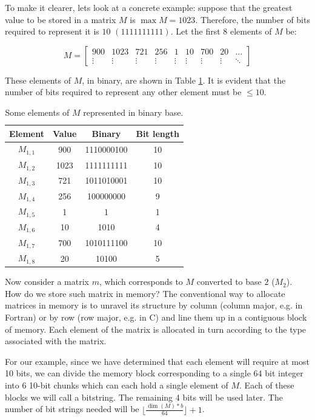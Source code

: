 \documentclass[10pt]{article}
\begin{document}
To make it clearer, lets look at a concrete example: suppose that the greatest value to be stored in a matrix $M$ is $\max M=1023$. Therefore, the number of bits required to represent it is $10$ $(1111111111)$. Let the first 8 elements of $M$ be:

\begin{equation} \label{eq:08}
  M = \begin{bmatrix}
  900 & 1023 & 721 & 256 & 1 & 10 & 700 & 20 & \hdots\\ 
  \vdots & \vdots & \vdots & \vdots & \vdots & \vdots & \vdots & \vdots & \ddots 
  \end{bmatrix}
\end{equation}

These elements of $M$, in binary, are shown in Table \ref{tab:01}. It is evident that the number of bits required to represent any other element must be $\leq 10$.

\begin{table}[h]
 \centering
 \caption{Some elements of $M$ represented in binary base.}
 \begin{tabular}{cccc} 
  \hline 
  Element & Value  & Binary & Bit length\\
  \hline
  $M_{1,1}$ & 900  & 1110000100 & 10\\
  $M_{1,2}$ & 1023 & 1111111111 & 10\\
  $M_{1,3}$ & 721  & 1011010001 & 10\\
  $M_{1,4}$ & 256  & 100000000  & 9\\
  $M_{1,5}$ & 1    & 1          & 1\\
  $M_{1,6}$ & 10   & 1010       & 4\\
  $M_{1,7}$ & 700  & 1010111100 & 10\\
  $M_{1,8}$ & 20   & 10100      & 5\\
  \hline
 \end{tabular}
 \label{tab:01}
\end{table}

Now consider a matrix $m$, which corresponds to $M$ converted to base $2$ ($M_2$). How do we store such matrix in memory? The conventional way to allocate matrices in memory is to unravel its structure by column (column major, e.g. in Fortran) or by row (row major, e.g. in C) and line them up in a contiguous block of memory. Each element of the matrix is allocated in turn according to the type associated with the matrix.

For our example, since we have determined that each element will require at most 10 bits, we can divide the memory block corresponding to a single 64 bit integer into 6 10-bit chunks which can each hold a single element of $M$. Each of these blocks we will call a bitstring. The remaining 4 bits will be used later. The number of bit strings needed will be $\lfloor \frac{\dim(M) *b} {64} \rfloor +1$.
\end{document}
